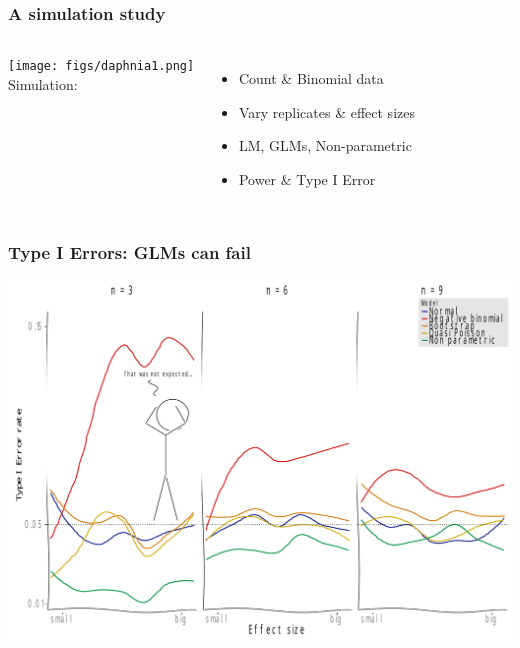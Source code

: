 \documentclass[
	10pt
	]{beamer}
\begin{document}
\begin{frame}
\frametitle{A simulation study}
	\begin{columns}[T]
		\texttt{[image: figs/daphnia1.png]}\\
		\vspace{2em}
		Simulation: 
		\begin{itemize}
			\item Count \& Binomial data
			\item Vary replicates \& effect sizes
			\item LM, GLMs, Non-parametric
			\item Power \& Type I Error
		\end{itemize}
		\begin{adjustbox}{max totalsize={\textwidth}{\textheight}}
					
		\end{adjustbox}
	\end{columns}
\end{frame}



\begin{frame}
\frametitle{Type I Errors: GLMs can fail}
	\begin{center}
		\includegraphics[width=\textwidth]{figs/p_t1_xkcd.pdf}
	\end{center}
\end{frame}
\end{document}
